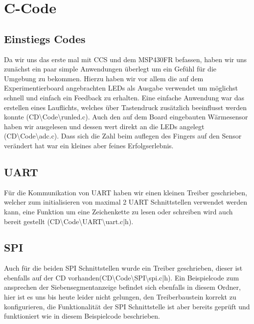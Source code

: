 \section{C-Code}

\subsection{Einstiegs Codes}
Da wir uns das erste mal mit CCS und dem MSP430FR befassen, haben wir uns zunächst ein paar simple Anwendungen überlegt um ein Gefühl für die Umgebung zu bekommen. Hierzu haben wir vor allem die auf dem Experimentierboard angebrachten LEDs als Ausgabe verwendet um möglichst schnell und einfach ein Feedback zu erhalten. Eine einfache Anwendung war das erstellen eines Lauflichts, welches über Tastendruck zusätzlich beeinflusst werden konnte \tiny(CD\textbackslash Code\textbackslash runled.c)\normalsize. Auch den auf dem Board eingebauten Wärmesensor haben wir ausgelesen und dessen wert direkt an die LEDs angelegt \tiny(CD\textbackslash Code\textbackslash adc.c)\normalsize. Dass sich die Zahl beim auflegen des Fingers auf den Sensor verändert hat war ein kleines aber feines Erfolgserlebnis.

\subsection{UART}
Für die Kommunikation von UART haben wir einen kleinen Treiber geschrieben, welcher zum initialisieren von maximal 2 UART Schnittstellen verwendet werden kann, eine Funktion um eine Zeichenkette zu lesen oder schreiben wird auch bereit gestellt \tiny(CD\textbackslash Code\textbackslash UART\textbackslash uart.c|h)\normalsize.

\subsection{SPI}
Auch für die beiden SPI Schnittstellen wurde ein Treiber geschrieben, dieser ist ebenfalls auf der CD vorhanden\tiny(CD\textbackslash Code\textbackslash SPI\textbackslash spi.c|h)\normalsize.
Ein Beispielcode zum ansprechen der Siebensegmentanzeige befindet sich ebenfalls in diesem Ordner, hier ist es uns bis heute leider nicht gelungen, den Treiberbaustein korrekt zu konfigurieren, die Funktionalität der SPI Schnittstelle ist aber bereits geprüft und funktioniert wie in diesem Beispielcode beschrieben.
